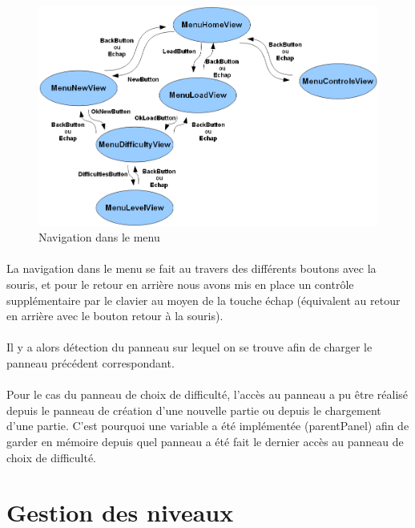 \documentclass[a4paper,12pt]{report}
\begin{document}
\begin{figure}[H]
\begin{center}
\includegraphics[scale=0.5]{images/navigationmenu.png} 
\end{center}
\caption{Navigation dans le menu}
\label{Navigation dans le menu}
\end{figure}

\paragraph{}La navigation dans le menu se fait au travers des différents boutons avec la souris, et pour le retour en arrière nous avons mis en place un contrôle supplémentaire par le clavier au moyen de la touche \guillemotleft échap \guillemotright(équivalent au retour en arrière avec le bouton \guillemotleft retour \guillemotright à la souris).
\paragraph{}Il y a alors détection du panneau sur lequel on se trouve afin de charger le panneau \guillemotleft précédent \guillemotright correspondant. 
\paragraph{}Pour le cas du panneau de choix de difficulté, l’accès au panneau a pu être réalisé depuis le panneau de création d’une nouvelle partie ou depuis le chargement d’une partie. C’est pourquoi une variable a été implémentée (parentPanel) afin de garder en mémoire depuis quel panneau a été fait le dernier accès au panneau de choix de difficulté.


\section{Gestion des niveaux}
\end{document}
